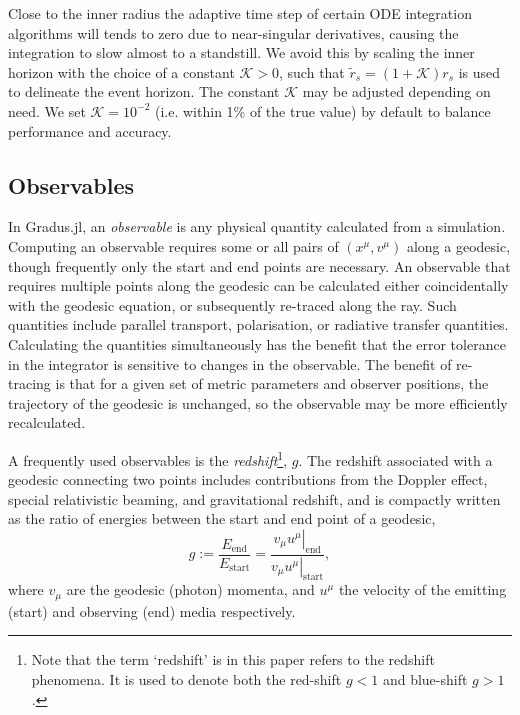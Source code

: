 \documentclass[fleqn,usenatbib]{mnras}
\newcommand{\software}[1]{{\sc #1}}
\newcommand{\Gradus}{\software{Gradus.jl}\xspace}
\begin{document}
Close to the inner radius the adaptive time step of certain ODE integration
algorithms will tends to zero due to near-singular derivatives, causing the
integration to slow almost to a standstill. We avoid this by scaling the inner
horizon with the choice of a constant $\mathcal{K} > 0$, such that $\tilde{r}_s
= (1 + \mathcal{K}) r_s$ is used to delineate the event horizon.  The constant
$\mathcal{K}$ may be adjusted depending on need. We set $\mathcal{K} = 10^{-2}$
(i.e. within 1\% of the true value) by default to balance performance and
accuracy.

\subsection{Observables}
\label{sec:computing-observables}

In \Gradus, an \textit{observable} is any physical quantity calculated from a
simulation. Computing an observable requires some or all pairs of $(x^\mu,
v^\mu)$ along a geodesic, though frequently only the start and end points are
necessary. An observable that requires multiple points along the geodesic can be
calculated either coincidentally with the geodesic equation, or subsequently
re-traced along the ray. Such quantities include parallel transport,
polarisation, or radiative transfer quantities. Calculating the quantities
simultaneously has the benefit that the error tolerance in the integrator is
sensitive to changes in the observable. The benefit of re-tracing is that for a
given set of metric parameters and observer positions, the trajectory of the
geodesic is unchanged, so the observable may be more efficiently recalculated.

A frequently used observables is the \emph{redshift}\footnote{Note that the term
`redshift' is in this paper refers to the redshift phenomena. It is used to
denote both the red-shift $g < 1$ and blue-shift $g > 1$.}, $g$. The redshift
associated with a geodesic connecting two points includes contributions from the
Doppler effect, special relativistic beaming, and gravitational redshift, and is
compactly written as the ratio of energies between the start and end point of a
geodesic,
\begin{equation}
\label{eq:redshift}
g := \frac{E_\text{end}}{E_\text{start}} = \frac{\left. v_\mu u^\mu
\right\rvert_\text{end}}{\left. v_\mu u^\mu \right\rvert_{\text{start}}},
\end{equation}
where $v_\mu$ are the geodesic (photon) momenta, and $u^\mu$ the velocity of the
emitting (start) and observing (end) media respectively.
\end{document}

